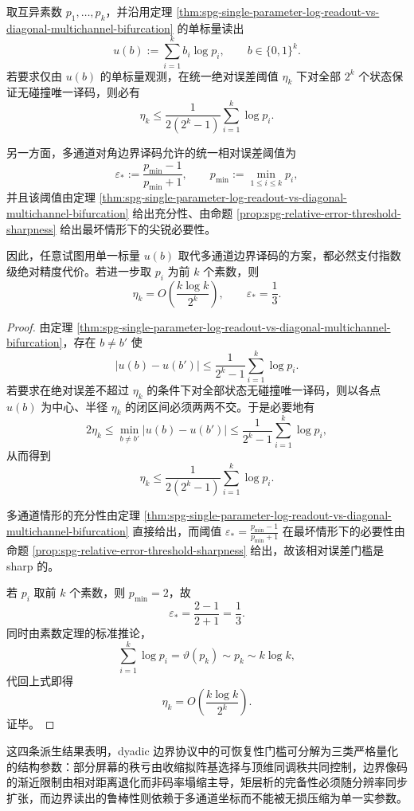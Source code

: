 \begin{theorem}\label{thm:xi-time-part65a-scalar-vs-multichannel-exponential-precision-gap}
取互异素数 \(p_1,\dots,p_k\)，并沿用定理 \ref{thm:spg-single-parameter-log-readout-vs-diagonal-multichannel-bifurcation} 的单标量读出
\[
u(b):=\sum_{i=1}^k b_i\log p_i,
\qquad
b\in\{0,1\}^k.
\]
若要求仅由 \(u(b)\) 的单标量观测，在统一绝对误差阈值 \(\eta_k\) 下对全部 \(2^k\) 个状态保证无碰撞唯一译码，则必有
\[
\eta_k
\le
\frac{1}{2(2^k-1)}
\sum_{i=1}^k\log p_i.
\]

另一方面，多通道对角边界译码允许的统一相对误差阈值为
\[
\varepsilon_\ast
:=
\frac{p_{\min}-1}{p_{\min}+1},
\qquad
p_{\min}:=\min_{1\le i\le k}p_i,
\]
并且该阈值由定理 \ref{thm:spg-single-parameter-log-readout-vs-diagonal-multichannel-bifurcation} 给出充分性、由命题 \ref{prop:spg-relative-error-threshold-sharpness} 给出最坏情形下的尖锐必要性。

因此，任意试图用单一标量 \(u(b)\) 取代多通道边界译码的方案，都必然支付指数级绝对精度代价。若进一步取 \(p_i\) 为前 \(k\) 个素数，则
\[
\eta_k=O\!\left(\frac{k\log k}{2^k}\right),
\qquad
\varepsilon_\ast=\frac13.
\]
\end{theorem}
\begin{proof}
由定理 \ref{thm:spg-single-parameter-log-readout-vs-diagonal-multichannel-bifurcation}，存在 \(b\neq b'\) 使
\[
|u(b)-u(b')|
\le
\frac{1}{2^k-1}\sum_{i=1}^k\log p_i.
\]
若要求在绝对误差不超过 \(\eta_k\) 的条件下对全部状态无碰撞唯一译码，则以各点 \(u(b)\) 为中心、半径 \(\eta_k\) 的闭区间必须两两不交。于是必要地有
\[
2\eta_k
\le
\min_{b\neq b'}|u(b)-u(b')|
\le
\frac{1}{2^k-1}\sum_{i=1}^k\log p_i,
\]
从而得到
\[
\eta_k
\le
\frac{1}{2(2^k-1)}
\sum_{i=1}^k\log p_i.
\]

多通道情形的充分性由定理
\ref{thm:spg-single-parameter-log-readout-vs-diagonal-multichannel-bifurcation} 直接给出，而阈值
\(
\varepsilon_\ast=\frac{p_{\min}-1}{p_{\min}+1}
\)
在最坏情形下的必要性由命题
\ref{prop:spg-relative-error-threshold-sharpness} 给出，故该相对误差门槛是 sharp 的。

若 \(p_i\) 取前 \(k\) 个素数，则 \(p_{\min}=2\)，故
\[
\varepsilon_\ast=\frac{2-1}{2+1}=\frac13.
\]
同时由素数定理的标准推论，
\[
\sum_{i=1}^k\log p_i=\vartheta(p_k)\sim p_k\sim k\log k,
\]
代回上式即得
\[
\eta_k=O\!\left(\frac{k\log k}{2^k}\right).
\]
证毕。
\end{proof}

\noindent
这四条派生结果表明，dyadic 边界协议中的可恢复性门槛可分解为三类严格量化的结构参数：部分屏幕的秩亏由收缩拟阵基选择与顶维同调秩共同控制，边界像码的渐近限制由相对距离退化而非码率塌缩主导，矩层析的完备性必须随分辨率同步扩张，而边界读出的鲁棒性则依赖于多通道坐标而不能被无损压缩为单一实参数。

\endinput
